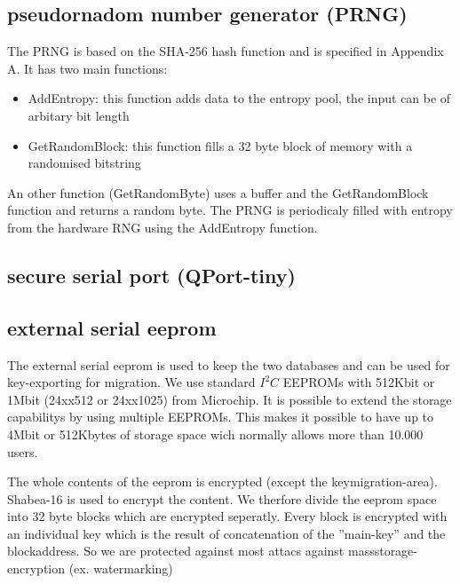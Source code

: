 \subsection{pseudornadom number generator (PRNG)}
The PRNG is based on the SHA-256 hash function and is specified in Appendix A.
It has two main functions:
\begin{itemize}
 \item AddEntropy: this function adds data to the entropy pool, the input can be of arbitary bit length
 \item GetRandomBlock: this function fills a 32 byte block of memory with a randomised bitstring
\end{itemize}
An other function (GetRandomByte) uses a buffer and the GetRandomBlock function and returns a random byte.
The PRNG is periodicaly filled with entropy from the hardware RNG using the AddEntropy function.

\subsection{secure serial port (QPort-tiny)}


\subsection{external serial eeprom}
The external serial eeprom is used to keep the two databases and can be used for key-exporting for migration. We use standard $I^2C$ EEPROMs with 512Kbit or 1Mbit (24xx512 or 24xx1025) from Microchip. It is possible to extend the storage capabilitys by using multiple EEPROMs. This makes it possible to have up to 4Mbit or 512Kbytes of storage space wich normally allows more than 10.000 users.

The whole contents of the eeprom is encrypted (except the keymigration-area). Shabea-16 is used to encrypt the content. We therfore divide the eeprom space into 32 byte blocks which are encrypted seperatly. Every block is encrypted with an individual key which is the result of concatenation of the ''main-key'' and the blockaddress. So we are protected against most attacs against massstorage-encryption (ex. watermarking) 


